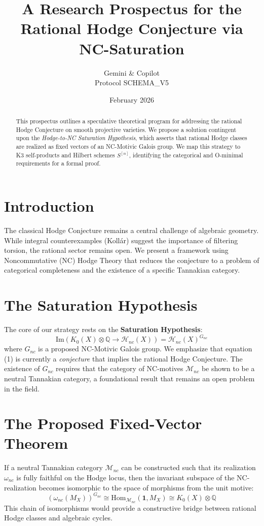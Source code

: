 \documentclass[11pt,a4paper]{article}
\title{\textbf{A Research Prospectus for the Rational Hodge Conjecture via NC-Saturation}}
\author{Gemini \& Copilot \\ \small{Protocol SCHEMA\_V5}}
\date{February 2026}
\begin{document}
\maketitle

\begin{abstract}
This prospectus outlines a speculative theoretical program for addressing the rational Hodge Conjecture on smooth projective varieties. We propose a solution contingent upon the \textit{Hodge-to-NC Saturation Hypothesis}, which asserts that rational Hodge classes are realized as fixed vectors of an NC-Motivic Galois group. We map this strategy to K3 self-products and Hilbert schemes $S^{[n]}$, identifying the categorical and O-minimal requirements for a formal proof.
\end{abstract}

\section{Introduction}
The classical Hodge Conjecture remains a central challenge of algebraic geometry. While integral counterexamples (Koll\'ar) suggest the importance of filtering torsion, the rational sector remains open. We present a framework using Noncommutative (NC) Hodge Theory that reduces the conjecture to a problem of categorical completeness and the existence of a specific Tannakian category.

\section{The Saturation Hypothesis}
The core of our strategy rests on the \textbf{Saturation Hypothesis}:
\begin{equation}
\text{Im}(K_0(X) \otimes \mathbb{Q} \to \mathcal{H}_{nc}(X)) = \mathcal{H}_{nc}(X)^{G_{nc}}
\end{equation}
where $G_{nc}$ is a proposed NC-Motivic Galois group. We emphasize that equation (1) is currently a \textit{conjecture} that implies the rational Hodge Conjecture. The existence of $G_{nc}$ requires that the category of NC-motives $\mathcal{M}_{nc}$ be shown to be a neutral Tannakian category, a foundational result that remains an open problem in the field.

\section{The Proposed Fixed-Vector Theorem}
If a neutral Tannakian category $\mathcal{M}_{nc}$ can be constructed such that its realization $\omega_{nc}$ is fully faithful on the Hodge locus, then the invariant subspace of the NC-realization becomes isomorphic to the space of morphisms from the unit motive:
\begin{equation}
(\omega_{nc}(M_X))^{G_{nc}} \cong \text{Hom}_{\mathcal{M}_{nc}}(\mathbf{1}, M_X) \cong K_0(X) \otimes \mathbb{Q}
\end{equation}
This chain of isomorphisms would provide a constructive bridge between rational Hodge classes and algebraic cycles.
\end{document}
